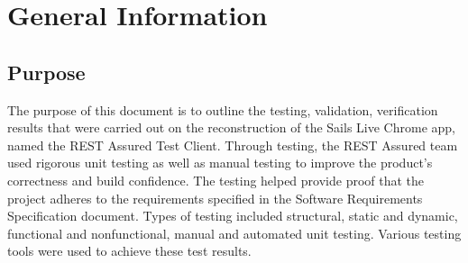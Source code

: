 \documentclass[12pt, titlepage]{article}
\begin{document}
\noindent

%
%
%
%
%

%
%

\section{General Information}
	
\subsection{Purpose}
The purpose of this document is to outline the testing, validation, verification results that were carried out on the reconstruction of the Sails Live Chrome app, named the REST Assured Test Client. Through testing, the REST Assured team used rigorous unit testing as well as manual testing to improve the product’s correctness and build confidence. The testing helped provide proof that the project adheres to the requirements specified in the Software Requirements Specification document. 
Types of testing included structural, static and dynamic, functional and nonfunctional, manual and automated unit testing. Various testing tools were used to achieve these test results.
\end{document}
